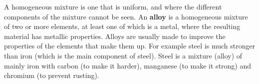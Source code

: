 \label{m38708*fhsst!!!underscore!!!id96} { \label{m38708*meaningfhsst!!!underscore!!!id96}
        A homogeneous mixture is one that is uniform, and where the different components of the mixture cannot be seen. 
         } 
        \label{m38708*id62795}An \textbf{alloy} is a homogeneous mixture of two or more elements, at least one of which is a metal, where the resulting material has metallic properties. Alloys are usually made to improve the properties of the elements that make them up. For example steel is much stronger than iron (which is the main component of steel). Steel is a mixture (alloy) of mainly iron with carbon (to make it harder), manganese (to make it strong) and chromium (to prevent rusting).\par 
\label{m38708*eip-479}
